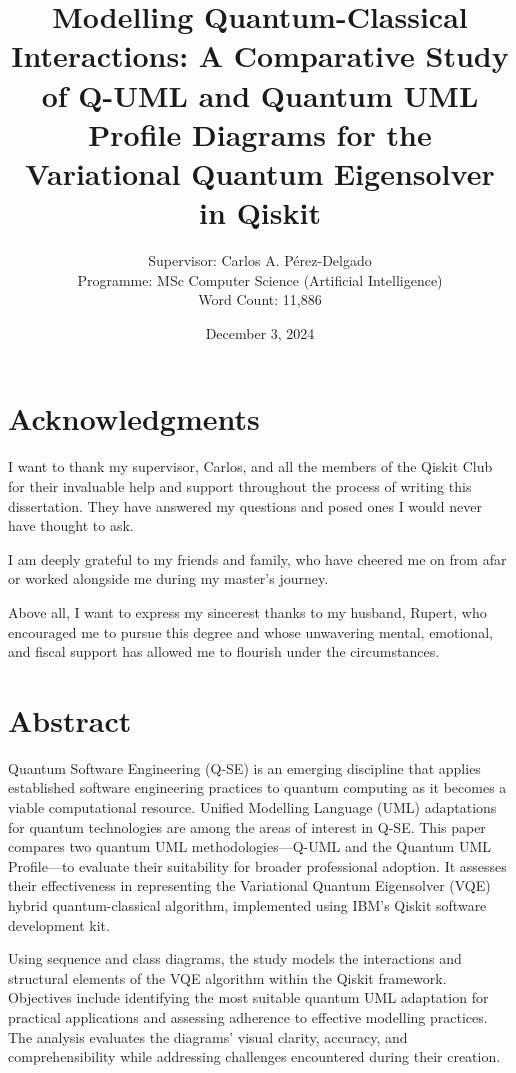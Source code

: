 \documentclass{article}
\title{Modelling Quantum-Classical Interactions: A Comparative Study of Q-UML and Quantum UML Profile Diagrams for the Variational Quantum Eigensolver in Qiskit}
\author{Supervisor: Carlos A. Pérez-Delgado\\ Programme: MSc Computer Science (Artificial Intelligence) \\ Word Count: 11,886}
\date{December 3, 2024}
\begin{document}
\maketitle

\thispagestyle{empty} %

\newpage
\setcounter{page}{1}

\section*{Acknowledgments}

I want to thank my supervisor, Carlos, and all the members of the Qiskit Club for their invaluable help and support throughout the process of writing this dissertation. They have answered my questions and posed ones I would never have thought to ask.

I am deeply grateful to my friends and family, who have cheered me on from afar or worked alongside me during my master’s journey.

Above all, I want to express my sincerest thanks to my husband, Rupert, who encouraged me to pursue this degree and whose unwavering mental, emotional, and fiscal support has allowed me to flourish under the circumstances.

\newpage

\section*{Abstract}

Quantum Software Engineering (Q-SE) is an emerging discipline that applies established software engineering practices to quantum computing as it becomes a viable computational resource. Unified Modelling Language (UML) adaptations for quantum technologies are among the areas of interest in Q-SE. This paper compares two quantum UML methodologies—Q-UML and the Quantum UML Profile—to evaluate their suitability for broader professional adoption. It assesses their effectiveness in representing the Variational Quantum Eigensolver (VQE) hybrid quantum-classical algorithm, implemented using IBM’s Qiskit software development kit.

Using sequence and class diagrams, the study models the interactions and structural elements of the VQE algorithm within the Qiskit framework. Objectives include identifying the most suitable quantum UML adaptation for practical applications and assessing adherence to effective modelling practices. The analysis evaluates the diagrams' visual clarity, accuracy, and comprehensibility while addressing challenges encountered during their creation.
\end{document}
